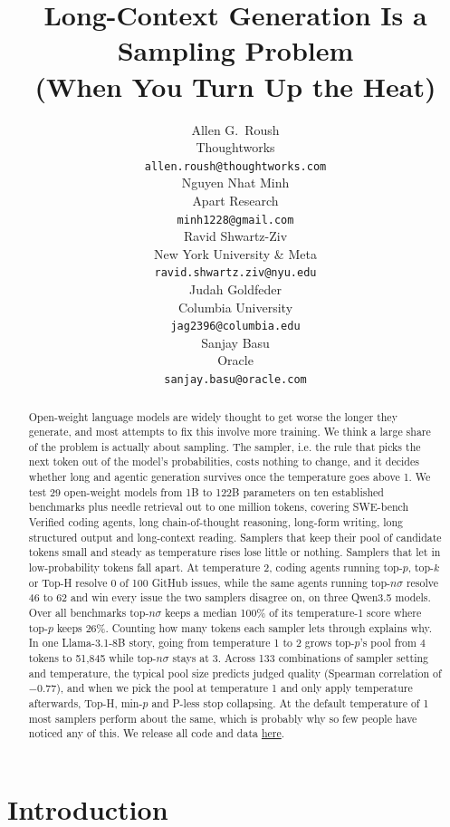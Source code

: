 \documentclass{article}
\title{Long-Context Generation Is a Sampling Problem\\(When You Turn Up the Heat)}
\author{%
  Allen G.\ Roush \\
  Thoughtworks \\
  \texttt{allen.roush@thoughtworks.com} \\
  \And
  Nguyen Nhat Minh \\
  Apart Research \\
  \texttt{minh1228@gmail.com} \\
  \And
  Ravid Shwartz-Ziv \\
  New York University \& Meta \\
  \texttt{ravid.shwartz.ziv@nyu.edu} \\
  \AND
  Judah Goldfeder \\
  Columbia University \\
  \texttt{jag2396@columbia.edu} \\
  \And
  Sanjay Basu \\
  Oracle \\
  \texttt{sanjay.basu@oracle.com} \\
}
\begin{document}
\maketitle


\begin{abstract}
Open-weight language models are widely thought to get worse the longer they generate, and most attempts to fix this involve more training. We think a large share of the problem is actually about sampling. The sampler, i.e. the rule that picks the next token out of the model's probabilities, costs nothing to change, and it decides whether long and agentic generation survives once the temperature goes above 1. We test 29 open-weight models from 1B to 122B parameters on ten established benchmarks plus needle retrieval out to one million tokens, covering SWE-bench Verified coding agents, long chain-of-thought reasoning, long-form writing, long structured output and long-context reading. Samplers that keep their pool of candidate tokens small and steady as temperature rises lose little or nothing. Samplers that let in low-probability tokens fall apart. At temperature 2, coding agents running top-$p$, top-$k$ or Top-H resolve 0 of 100 GitHub issues, while the same agents running top-$n\sigma$ resolve 46 to 62 and win every issue the two samplers disagree on, on three Qwen3.5 models. Over all benchmarks top-$n\sigma$ keeps a median 100\% of its temperature-1 score where top-$p$ keeps 26\%. Counting how many tokens each sampler lets through explains why. In one Llama-3.1-8B story, going from temperature 1 to 2 grows top-$p$'s pool from 4 tokens to 51,845 while top-$n\sigma$ stays at 3. Across 133 combinations of sampler setting and temperature, the typical pool size predicts judged quality (Spearman correlation of $-0.77$), and when we pick the pool at temperature 1 and only apply temperature afterwards, Top-H, min-$p$ and P-less stop collapsing. At the default temperature of 1 most samplers perform about the same, which is probably why so few people have noticed any of this. We release all code and data \href{https://github.com/Hellisotherpeople/Long-Context-Generation-Is-a-Sampling-Problem-8-}{here}.
\end{abstract}

\section{Introduction}
\end{document}
